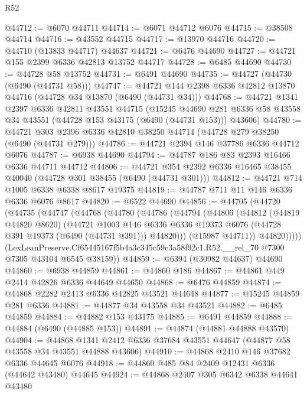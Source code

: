 \begin{lexlean}{R52}
\begin{coremodule}
@44712 := @6070 @44711
@44714 := @6071 @44712 @6076
@44715 := @38508 @44714
@44716 := @43552 @44715
@44717 := @13970 @44716
@44720 := @44710 (@13833 @44717) @44637
@44721 := @6476 @44690
@44727 := @44721 @155 @2399 @6336 @42813 @13752 @44717
@44728 := @6485 @44690
@44730 := @44728 @58 @13752
@44731 := @6491 @44690
@44735 := @44727 (@44730 (@6490 (@44731 @58)))
@44747 := @44721 @144 @2398 @6336 @42812 @13870 @44716 (@44728 @34 @13870 (@6490 (@44731 @34)))
@44768 := @44721
    @1341
    @2397
    @6336
    @42811
    @43551
    @44715
    (@15245
      @44690
      @281
      @6336
      @58
      @43558
      @34
      @43551
      (@44728 @153 @43175 (@6490 (@44731 @153)))
      @43606)
@44780 := @44721 @303 @2396 @6336 @42810 @38250 @44714 (@44728 @279 @38250 (@6490 (@44731 @279)))
@44786 := @44721 @2394 @146 @37786 @6336 @44712 @6076
@44787 := @6938 @44690
@44794 := @44787 @186 @83 @2393 @16466 @6336 @44711 @44712
@44806 := @44721 @354 @2392 @6336 @16465 @38455 @40040 (@44728 @301 @38455 (@6490 (@44731 @301)))
@44812 := @44721 @714 @1005 @6338 @6338 @8617 @19375
@44819 := @44787 @711 @11 @146 @6336 @6336 @6076 @8617
@44820 := @6522 @44690
@44856 := @44705
    (@44720
      (@44735
        (@44747
          (@44768
            (@44780
              (@44786
                (@44794
                  (@44806
                    (@44812
                      (@44819 @44820 @8620)
                      (@44721
                        @1003
                        @146
                        @6336
                        @6336
                        @19373
                        @6076
                        (@44728 @391 @19373 (@6490 (@44731 @391)))
                        @44820)))
                  (@15987 @44711))
                @44820)))))
      (LexLeanPreserve.Cf65445167f5b4a3c345c59c3a58f92c1.R52.__rel_70
        @7300
        @7305
        @43104
        @6545
        @38159))
@44859 := @6394 (@30982 @44637) @44690
@44860 := @6938 @44859
@44861 := @44860 @186
@44867 := @44861 @449 @2414 @42826 @6336 @44649 @44650
@44868 := @6476 @44859
@44874 := @44868 @2282 @2413 @6336 @42825 @43521 @44648
@44877 := @15245 @44859 @281 @6336
@44881 := @44877 @34 @43558 @34 @43521
@44882 := @6485 @44859
@44884 := @44882 @153 @43175
@44885 := @6491 @44859
@44888 := @44884 (@6490 (@44885 @153))
@44891 := @44874 (@44881 @44888 @43570)
@44904 := @44868 @1341 @2412 @6336 @37684 @43551 @44647 (@44877 @58 @43558 @34 @43551 @44888 @43606)
@44910 := @44868 @2410 @146 @37682 @6336 @44645 @6076
@44918 := @44860 @485 @84 @2409 @12431 @6336 (@44642 @43480) @44645
@44924 := @44868 @2407 @305 @6342 @6338 @44641 @43480

\end{coremodule}
\end{lexlean}
